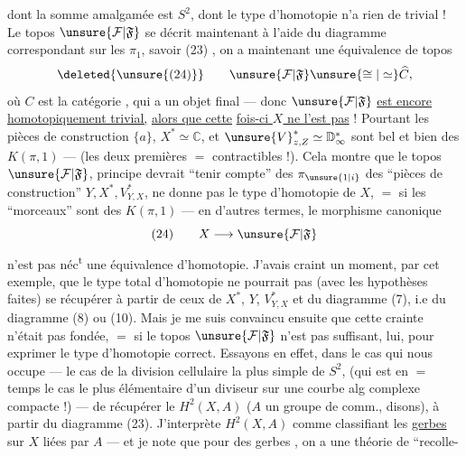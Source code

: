 dont la somme amalgamée est $S^2$, dont
le type d'homotopie n'a rien de trivial !
Le topos $\unsure{\mathcal F|\mathfrak F}$ se décrit maintenant à
l'aide du diagramme correspondant sur les $\pi_1$,
savoir
\noindent (23)
,
on a maintenant une équivalence de topos
\[
\deleted{\unsure{(24)}}\qquad \unsure{\mathcal F|\mathfrak F}\unsure{\cong|\simeq}\widehat C,
\]
où $C$ est la catégorie \diagram{\begin{tikzcd}[column sep=small]\bullet\arrow[r]&\bullet\end{tikzcd}}, qui a
un objet final --- donc $\unsure{\mathcal F|\mathfrak F}$ \uline{est encore}
\uline{homotopiquement trivial,} \uline{alors que cette}
\uline{fois-ci $X$ ne l'est pas} ! Pourtant les
pièces de construction $\{a\}$, $X^*\simeq\mathbb C$, et
$\unsure{V}^*_{z,Z}\simeq\mathbb D^*_{\infty}$ sont bel et bien des $K(\pi,1)$ ---
(les deux premières $=$ contractibles !). Cela
montre que le topos $\unsure{\mathcal F|\mathfrak F}$, 
principe devrait ``tenir compte'' des
$\pi_{\unsure{1|i}}$ des ``pièces de construction'' $Y,X^*,V^*_{Y,X}$,
ne donne pas  le type d'homotopie
de $X$, $=$ si les ``morceaux'' sont des
$K(\pi,1)$ --- en d'autres termes, le
morphisme canonique
\[
(24)\qquad X\longrightarrow\unsure{\mathcal F|\mathfrak F}
\]
n'est pas néc\textsuperscript{t} une équivalence d'homotopie.
J'avais craint un moment, par cet exemple,
que le type total d'homotopie  ne pourrait
pas (avec les hypothèses  faites) se récupérer
à partir de ceux de $X^*$, $Y$, $V^*_{Y,X}$ et du
diagramme (7), i.e du diagramme (8)
ou (10). Mais je me suis convaincu ensuite
que cette crainte n'était pas fondée, $=$ si
le topos $\unsure{\mathcal F|\mathfrak F}$ n'est pas suffisant, lui, pour
exprimer le type d'homotopie correct.
Essayons en effet, dans le cas qui nous
occupe --- le cas de la division cellulaire
la plus simple de $S^2$, (qui est en $=$ temps
le cas le plus  élémentaire d'un
diviseur sur une courbe alg complexe
compacte !) --- de récupérer le $H^2(X,A)$
($A$ un groupe de  comm., disons),
à partir du diagramme (23). J'interprète
$H^2(X,A)$ comme classifiant les \uline{gerbes} sur
$X$ liées par $A$ --- et je note que pour des
 gerbes , on a une théorie de ``recolle-
